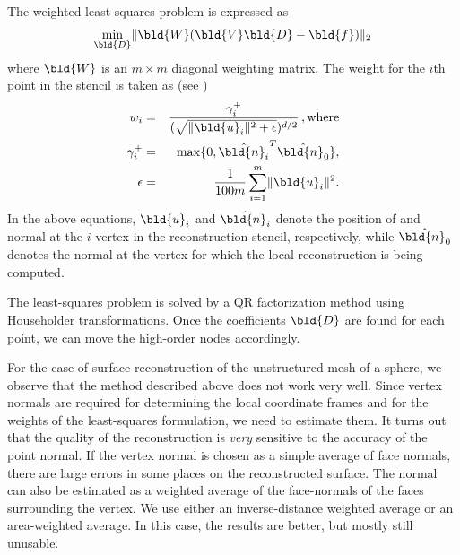 The weighted least-squares problem is expressed as
\begin{equation}
\min_{\bld{D}} \lVert \bld{W}(\bld{V}\bld{D}-\bld{f})\rVert_2
\label{eq:sr_wls}
\end{equation}
where $\bld{W}$ is an $m \times m$ diagonal weighting matrix. The weight for the $i$th point in the stencil is taken as (see \cite{sr:diffquant})
\begin{eqnarray}
w_i &=& \frac{\gamma_i^+}{(\sqrt{\lVert\bld{u}_i\rVert^2 + \epsilon})^{d/2}} \, , \text{where} \\
\gamma_i^+ &=& \max\{0,\hat{\bld{n}_i}^ T\hat{\bld{n}_0}\}, \\
\epsilon &=& \frac{1}{100m} \sum_{i=1}^m \lVert\bld{u}_i \rVert^2.
\label{eq:sr_weight}
\end{eqnarray}
In the above equations, $\bld{u}_i$ and $\hat{\bld{n}_i}$ denote the position of and normal at the $i$ vertex in the reconstruction stencil, respectively, while $\hat{\bld{n}_0}$ denotes the normal at the vertex for which the local reconstruction is being computed.

The least-squares problem is solved by a QR factorization method using Householder transformations. Once the coefficients $\bld{D}$ are found for each point, we can move the high-order nodes accordingly.

For the case of surface reconstruction of the unstructured mesh of a sphere, we observe that the method described above does not work very well. Since vertex normals are required for determining the local coordinate frames and for the weights of the least-squares formulation, we need to estimate them. It turns out that the quality of the reconstruction is \emph{very} sensitive to the accuracy of the point normal. If the vertex normal is chosen as a simple average of face normals, there are large errors in some places on the reconstructed surface. The normal can also be estimated as a weighted average of the face-normals of the faces surrounding the vertex. We use either an inverse-distance weighted average or an area-weighted average. In this case, the results are better, but mostly still unusable. 
